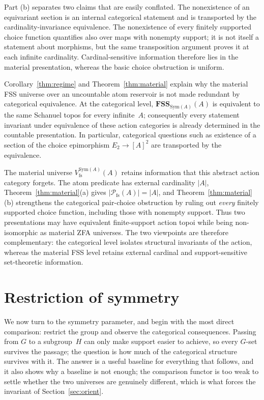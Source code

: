\documentclass{lmcs}
\newcommand{\Sym}{\mathrm{Sym}}
\newcommand{\fs}{\mathrm{fs}}
\newcommand{\FSS}{\mathbf{FSS}}
\newcommand{\Pfs}{\mathcal{P}_{\fs}}
\newcommand{\Vfs}{V_{\fs}}
\begin{document}
\begin{rem}
Part (b) separates two claims that are easily conflated. The
nonexistence of an equivariant section is an internal categorical
statement and is transported by the cardinality-invariance
equivalence. The
nonexistence of every finitely supported choice function quantifies
also over maps with nonempty support; it is not itself a statement
about morphisms, but the same transposition argument proves it at each
infinite cardinality. Cardinal-sensitive information therefore lies
in the material presentation, whereas the basic choice obstruction is
uniform.
\end{rem}

\begin{rem}\label{rem:structuralism}
Corollary~\ref{thm:regime} and Theorem~\ref{thm:material} explain why the
material FSS universe over an uncountable atom reservoir is not made
redundant by categorical equivalence. At the categorical level,
$\FSS_{\Sym(A)}(A)$ is equivalent to the same Schanuel topos for every
infinite~$A$; consequently every statement invariant under equivalence of
these action categories is already determined in the countable
presentation. In particular, categorical questions such as existence of a
section of the choice epimorphism $E_2\to[A]^2$ are transported by the
equivalence.

The material universe $\Vfs^{\Sym(A)}(A)$ retains information that this
abstract action category forgets. The atom predicate has external
cardinality $|A|$, Theorem~\ref{thm:material}(a) gives
$|\Pfs(A)|=|A|$, and Theorem~\ref{thm:material}(b) strengthens the
categorical pair-choice obstruction by ruling out \emph{every} finitely
supported choice function, including those with nonempty support. Thus two
presentations may have equivalent finite-support action topoi while being
non-isomorphic as material ZFA universes. The two viewpoints are therefore
complementary: the categorical level isolates structural invariants of the
action, whereas the material FSS level retains external cardinal and
support-sensitive set-theoretic information.
\end{rem}

\section{Restriction of symmetry}\label{sec:restrict}

We now turn to the symmetry parameter, and begin with the most direct comparison: restrict the group and observe the categorical consequences.
Passing from $G$ to a subgroup~$H$ can only make support easier to achieve, so every $G$-set survives the passage; the question is how much of the categorical structure survives with it. The answer is a useful baseline for everything that follows, and it also shows why a baseline is not enough; the comparison functor is too weak to settle whether the two universes are genuinely different, which is what forces the invariant of Section~\ref{sec:orient}.
\end{document}
